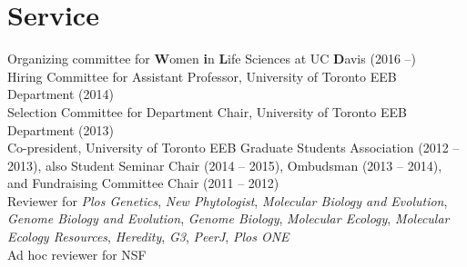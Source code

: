 \documentclass[letterpaper]{article}
\begin{document}
\section*{Service}
Organizing committee for \textbf{W}omen \textbf{i}n \textbf{L}ife Sciences at UC \textbf{D}avis (2016 --) \\ [.5ex]
Hiring Committee for Assistant Professor, University of Toronto EEB Department (2014) \\ [.5ex]
Selection Committee for Department Chair, University of Toronto EEB Department (2013) \\ [.5ex]
Co-president, University of Toronto EEB Graduate Students Association (2012 -- 2013), also Student Seminar Chair (2014 -- 2015), Ombudsman (2013 -- 2014), and Fundraising Committee Chair (2011 -- 2012)\\ [.5ex]
Reviewer for \textit{Plos Genetics}, \textit{New Phytologist}, \textit{Molecular Biology and Evolution}, \textit{Genome Biology and Evolution}, \textit{Genome Biology}, \textit{Molecular Ecology}, \textit{Molecular Ecology Resources}, \textit{Heredity}, \textit{G3}, \textit{PeerJ}, \textit{Plos ONE}\\
Ad hoc reviewer for NSF
%
\end{document}
